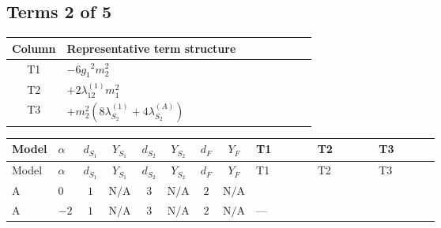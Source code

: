 \documentclass[8pt]{article}
\begin{document}
\begin{landscape}
\subsection*{Terms 2 of 5}
\begin{center}
\begin{tabular}{@{}c >{\raggedright\arraybackslash}p{0.82\linewidth}@{}}
\toprule
Column & Representative term structure \\
\midrule
T1 & \(\displaystyle -6 {g_1}^2 {m_2^2}\) \\
\midrule
T2 & \(\displaystyle +2 {\lambda_{12}^{(1)}} {m_1^2}\) \\
\midrule
T3 & \(\displaystyle +{m_2^2} (8 {\lambda_{S_2}^{(1)}}+4 {\lambda_{S_2}^{(A)}})\) \\
\midrule
\bottomrule
\end{tabular}
\end{center}
\smallskip
\tiny
\begin{longtable}{@{}llcccccc >{\raggedright\arraybackslash}p{0.21\linewidth} >{\raggedright\arraybackslash}p{0.21\linewidth} >{\raggedright\arraybackslash}p{0.21\linewidth}@{}}
\toprule
Model & $\alpha$ & $d_{S_1}$ & $Y_{S_1}$ & $d_{S_2}$ & $Y_{S_2}$ & $d_F$ & $Y_F$ & T1 & T2 & T3 \\
\midrule
\endfirsthead
\toprule
Model & $\alpha$ & $d_{S_1}$ & $Y_{S_1}$ & $d_{S_2}$ & $Y_{S_2}$ & $d_F$ & $Y_F$ & T1 & T2 & T3 \\
\midrule
\endhead
A & $0$ & $1$ & $\text{N/A}$ & $3$ & $\text{N/A}$ & $2$ & $\text{N/A}$ & \scriptsize\adjustbox{max width=\linewidth}{$\begin{gathered} -6 {g_1}^2 {m_2^2}\end{gathered}$} & \scriptsize\adjustbox{max width=\linewidth}{$\begin{gathered} +2 {\lambda_{12}^{(1)}} {m_1^2}\end{gathered}$} & \scriptsize\adjustbox{max width=\linewidth}{$\begin{gathered} +{m_2^2} (8 {\lambda_{S_2}^{(1)}}+4 {\lambda_{S_2}^{(A)}})\end{gathered}$} \\
\midrule
A & $-2$ & $1$ & $\text{N/A}$ & $3$ & $\text{N/A}$ & $2$ & $\text{N/A}$ & --- & \scriptsize\adjustbox{max width=\linewidth}{$\begin{gathered} +2 {\lambda_{12}^{(1)}} {m_1^2}\end{gathered}$} & \scriptsize\adjustbox{max width=\linewidth}{$\begin{gathered} +{m_2^2} (8 {\lambda_{S_2}^{(1)}}+4 {\lambda_{S_2}^{(A)}})\end{gathered}$} \\

\end{longtable}
\end{landscape}
\end{document}
